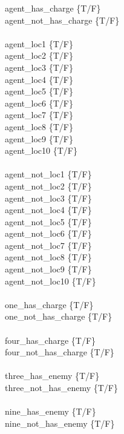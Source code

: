 \documentclass{article}
\def\ans#1{{\color{ans}#1}}
\begin{document}
\begin{enumerate}[label=(\alph*)]
    \ans{
    		\begin{multicols}{2}
                agent\_has\_charge \{T/F\} \\
                agent\_not\_has\_charge \{T/F\} \\ \\
                agent\_loc1   \{T/F\} \\
                agent\_loc2   \{T/F\} \\
                agent\_loc3   \{T/F\} \\
                agent\_loc4   \{T/F\} \\
                agent\_loc5   \{T/F\} \\
                agent\_loc6   \{T/F\} \\
                agent\_loc7   \{T/F\} \\
                agent\_loc8   \{T/F\} \\
                agent\_loc9   \{T/F\} \\
                agent\_loc10   \{T/F\} \\ \\
                agent\_not\_loc1   \{T/F\} \\
                agent\_not\_loc2   \{T/F\} \\
                agent\_not\_loc3   \{T/F\} \\
                agent\_not\_loc4   \{T/F\} \\
                agent\_not\_loc5   \{T/F\} \\
                agent\_not\_loc6   \{T/F\} \\
                agent\_not\_loc7   \{T/F\} \\
                agent\_not\_loc8   \{T/F\} \\
                agent\_not\_loc9   \{T/F\} \\
                agent\_not\_loc10   \{T/F\} \\ \\
                one\_has\_charge \{T/F\} \\
                one\_not\_has\_charge \{T/F\} \\ \\
                four\_has\_charge \{T/F\} \\
                four\_not\_has\_charge \{T/F\} \\ \\
                three\_has\_enemy \{T/F\} \\
                three\_not\_has\_enemy \{T/F\} \\ \\
                nine\_has\_enemy \{T/F\} \\
                nine\_not\_has\_enemy \{T/F\} \\ \\
   		\end{multicols}
    }  \\
    

\end{enumerate}
\end{document}
